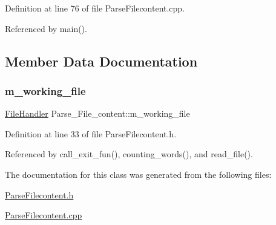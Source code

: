 Definition at line 76 of file Parse\+Filecontent.\+cpp.



Referenced by main().



\subsection{Member Data Documentation}
\mbox{\label{class_parse___file__content_a9c8b30de899c7c814c22b444146c54d9}} 
\subsubsection{\texorpdfstring{m\+\_\+working\+\_\+file}{m\_working\_file}}
{\footnotesize\ttfamily \mbox{\hyperlink{class_file_handler}{File\+Handler}} Parse\+\_\+\+File\+\_\+content\+::m\+\_\+working\+\_\+file\hspace{0.3cm}{\ttfamily [private]}}



Definition at line 33 of file Parse\+Filecontent.\+h.



Referenced by call\+\_\+exit\+\_\+fun(), counting\+\_\+words(), and read\+\_\+file().



The documentation for this class was generated from the following files\+:\begin{DoxyCompactItemize}
\item 
\mbox{\hyperlink{_parse_filecontent_8h}{Parse\+Filecontent.\+h}}\item 
\mbox{\hyperlink{_parse_filecontent_8cpp}{Parse\+Filecontent.\+cpp}}\end{DoxyCompactItemize}
